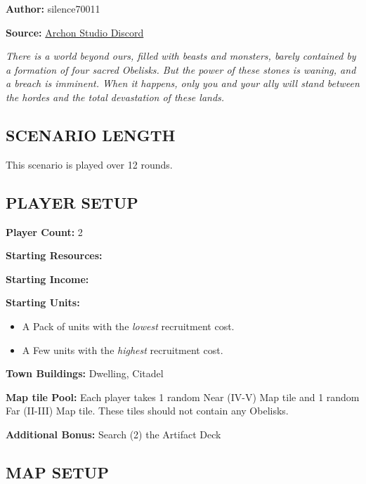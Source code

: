 
\begin{multicols*}{2}

\textbf{Author:} silence70011

\textbf{Source:} \href{https://discord.com/channels/740870068178649108/1233112440322002964/1233112440322002964}{Archon Studio Discord}

\textit{There is a world beyond ours, filled with beasts and monsters, barely contained by a formation of four sacred Obelisks.
  But the power of these stones is waning, and a breach is imminent.
  When it happens, only you and your ally will stand between the hordes and the total devastation of these lands.
}

\subsection*{\MakeUppercase{Scenario Length}}

This scenario is played over 12 rounds.

\subsection*{\MakeUppercase{Player Setup}}

\textbf{Player Count:} 2

\textbf{Starting Resources:}\par
{}

\textbf{Starting Income:}\par
{}

\textbf{Starting Units:}
\begin{itemize}
  \item A Pack of  units with the \textit{lowest} recruitment cost.
  \item A Few  units with the \textit{highest} recruitment cost.
\end{itemize}

\textbf{Town Buildings:}  Dwelling, Citadel

\textbf{Map tile Pool:} Each player takes 1 random Near (IV-V) Map tile and 1 random Far (II-III) Map tile. These tiles should not contain any Obelisks.

\textbf{Additional Bonus:} Search (2) the Artifact Deck

\subsection*{\MakeUppercase{Map Setup}}


\end{multicols*}
